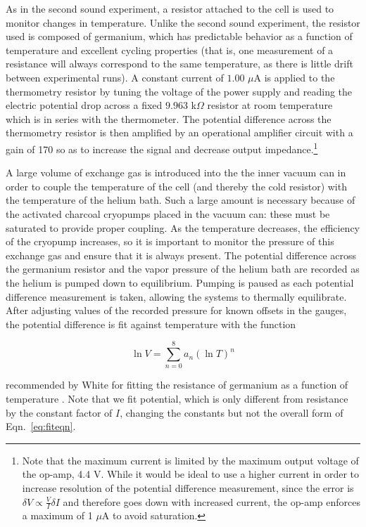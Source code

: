 As in the second sound experiment, a resistor attached to the cell is
used to monitor changes in temperature. Unlike the second sound
experiment, the resistor used is composed of germanium, which has
predictable behavior as a function of temperature and excellent
cycling properties (that is, one measurement of a resistance will
always correspond to the same temperature, as there is little drift
between experimental runs). A constant current of $1.00$ $\mu$A is
applied to the thermometry resistor by tuning the voltage of the power
supply and reading the electric potential drop across a fixed $9.963$
k$\Omega$ resistor at room temperature which is in series with the
thermometer. The potential difference across the thermometry resistor
is then amplified by an operational amplifier circuit with a gain of
170 so as to increase the signal and decrease output impedance.\footnote{Note that the maximum current is limited by the maximum
  output voltage of the op-amp, 4.4 V. While it would be ideal to
  use a higher current in order to increase resolution of the
  potential difference measurement, since the error is $\delta V
  \propto \frac{V}{I} \delta I$ and therefore goes down with increased
  current, the op-amp enforces a maximum of 1 $\mu$A to avoid
  saturation.}

A large volume of exchange gas is introduced into the the inner vacuum
can in order to couple the temperature of the cell (and thereby the
cold resistor) with the temperature of the helium bath. Such a large
amount is necessary because of the activated charcoal cryopumps
placed in the vacuum can: these must be saturated to provide proper
coupling. As the temperature decreases, the efficiency of the cryopump
increases, so it is important to monitor the pressure of this exchange
gas and ensure that it is always present. The potential difference
across the germanium resistor and the vapor pressure of the helium
bath are recorded as the helium is pumped down to equilibrium. Pumping
is paused as each potential difference measurement is taken, allowing
the systems to thermally equilibrate. After adjusting values of the
recorded pressure for known offsets in the gauges, the potential
difference is fit against temperature with the function

\begin{equation}
\label{eq:fiteqn}
\ln{V} = \sum_{n=0}^{8} a_{n} (\ln{T})^{n}
\end{equation}

recommended by White for fitting the resistance of germanium as a
function of temperature \cite{white}. Note that we fit potential,
which is only different from resistance by the constant factor of $I$,
changing the constants but not the overall form of
Eqn.~\ref{eq:fiteqn}.

